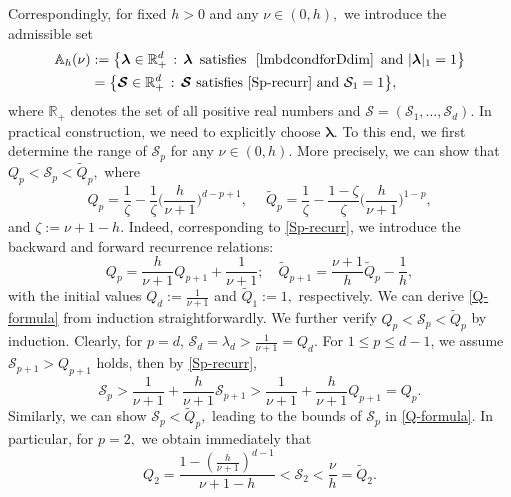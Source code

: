 \documentclass[10pt,reqno,final]{amsart}
\theoremstyle{remark}
\theoremstyle{definition}
\newcommand{\bs}[1]{\boldsymbol{#1}}
\begin{document}
Correspondingly, for fixed $h>0$ and any $\nu\in (0,h),$ we introduce the admissible set 
\begin{equation}\label{admiss-lam-S}
\begin{split}
  {\mathbb A}_h(\nu)&:=\big\{\bs \lambda\in \mathbb R_+^d\,:\, \bs \lambda ~\, \text{satisfies} \,~\, \eqref{lmbdcondforDdim} ~\, \text{and} ~ |\bs \lambda|_1=1  \big\}\\
  &= \big\{\bs {\mathcal S}\in \mathbb R_+^d\,:\, \bs {\mathcal S} ~ \text{satisfies} ~ \eqref{Sp-recurr}~ \text{and}~ {\mathcal S}_1=1  \big\},
  \end{split}
\end{equation}
where $\mathbb R_+$ denotes the set of all positive real numbers and $\bs {\mathcal S}=({\mathcal S}_1,\ldots, {\mathcal S}_d).$
In practical construction, we need to explicitly choose  $\bs\lambda.$ To this end, we first determine the range of ${\mathcal S}_p$ for any $\nu\in (0,h).$ More precisely, we can show that $Q_p<{\mathcal S}_p<\widetilde Q_p,$ where 
\begin{equation}\label{Q-formula}
Q_p=\frac 1 \zeta-\frac 1\zeta \Big(\frac{h}{\nu+1}\Big)^{d-p+1}, 
\quad\;  \widetilde Q_p=
\frac 1 \zeta -\frac{1-\zeta}\zeta  \Big(\frac{h}{\nu+1}\Big)^{1-p},
\end{equation} 
and $\zeta:=\nu+1-h.$ Indeed, corresponding to \eqref{Sp-recurr}, we introduce the backward and forward recurrence relations:
\begin{equation}\label{QpQp}
    Q_p=\frac{h}{\nu+1}Q_{p+1}+\frac{1}{\nu+1}; \quad 
    \widetilde Q_{p+1}=\frac{\nu+1}{h}\widetilde Q_{p}-\frac 1 h,
\end{equation}
 with the initial values
$Q_d:=\tfrac{1}{\nu+1}$ and $\widetilde Q_1:=1,$ respectively. We can derive \eqref{Q-formula} from induction straightforwardly.  
We further verify $Q_p<{\mathcal S}_p<\widetilde Q_p$ by induction. Clearly,  
for $p=d$, ${\mathcal S}_d=\lambda_d>\tfrac{1}{\nu+1}=Q_d.$ 
For $1\leq p\leq d-1$, we assume ${\mathcal S}_{p+1}>Q_{p+1}$ holds, then  by \eqref{Sp-recurr}, 
\begin{equation*}
{\mathcal S}_p>\frac{1}{\nu+1}+\frac{h}{\nu+1}{\mathcal S}_{p+1}>\frac{1}{\nu+1}+\frac{h}{\nu+1}Q_{p+1}=Q_p.
\end{equation*}
Similarly, we can show ${\mathcal S}_p<\widetilde Q_p,$  leading to the bounds of ${\mathcal S}_p$ in  \eqref{Q-formula}.  
In particular, for $p=2,$  we obtain immediately that 
\begin{equation*}
Q_2=\frac{1-(\frac{h}{\nu+1})^{d-1}}{\nu+1-h}<{\mathcal S}_2<\frac{\nu}{h}=\widetilde Q_2.
\end{equation*}
\end{document}
